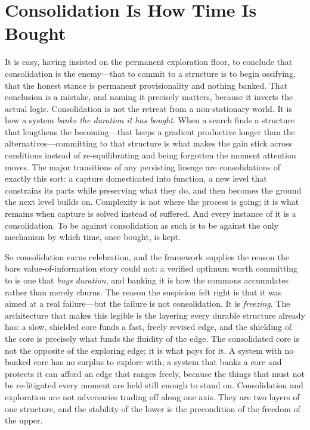 \documentclass{article}
\begin{document}
\section*{Consolidation Is How Time Is Bought}

It is easy, having insisted on the permanent exploration floor, to conclude that consolidation is the enemy---that to commit to a structure is to begin ossifying, that the honest stance is permanent provisionality and nothing banked. That conclusion is a mistake, and naming it precisely matters, because it inverts the actual logic. Consolidation is not the retreat from a non-stationary world. It is how a system \textit{banks the duration it has bought}. When a search finds a structure that lengthens the becoming---that keeps a gradient productive longer than the alternatives---committing to that structure is what makes the gain stick across conditions instead of re-equilibrating and being forgotten the moment attention moves. The major transitions of any persisting lineage are consolidations of exactly this sort: a capture domesticated into function, a new level that constrains its parts while preserving what they do, and then becomes the ground the next level builds on. Complexity is not where the process is going; it is what remains when capture is solved instead of suffered. And every instance of it is a consolidation. To be against consolidation as such is to be against the only mechanism by which time, once bought, is kept.

So consolidation earns celebration, and the framework supplies the reason the bare value-of-information story could not: a verified optimum worth committing to is one that \textit{buys duration}, and banking it is how the commons accumulates rather than merely churns. The reason the suspicion felt right is that it was aimed at a real failure---but the failure is not consolidation. It is \textit{freezing}. The architecture that makes this legible is the layering every durable structure already has: a slow, shielded core funds a fast, freely revised edge, and the shielding of the core is precisely what funds the fluidity of the edge. The consolidated core is not the opposite of the exploring edge; it is what pays for it. A system with no banked core has no surplus to explore with; a system that banks a core and protects it can afford an edge that ranges freely, because the things that must not be re-litigated every moment are held still enough to stand on. Consolidation and exploration are not adversaries trading off along one axis. They are two layers of one structure, and the stability of the lower is the precondition of the freedom of the upper.
\end{document}

